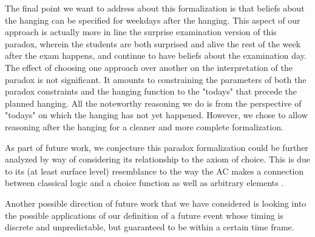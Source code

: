 \documentclass[runningheads]{llncs}
\newenvironment{myindent}{\begin{adjustwidth}{1cm}{}}{\end{adjustwidth}}
\begin{document}
The final point we want to address about this formalization is that beliefs about
the hanging can be specified for weekdays after the hanging.
This aspect of our approach is actually more in line the surprise examination version of this paradox,
wherein the students are both surprised and alive the rest of the week after the exam happens,
and continue to have beliefs about the examination day. The effect of choosing
one approach over another on the interpretation of the paradox is not significant.
It amounts to constraining the parameters of both the paradox constraints and
the hanging function to the "todays" that precede the planned hanging. All the noteworthy
reasoning we do is from the perspective of
 "todays" on which the hanging has not yet happened.
However, we chose to allow reasoning after the hanging for a cleaner and more
complete formalization.

As part of future work, we conjecture this paradox formalization could be further analyzed by way of considering its
relationship to the axiom of choice. This is due to its (at least surface level)
resemblance to the way the AC makes a connection between classical logic
and a choice function \cite{accomp} as well as arbitrary elements \cite{randomness}.

Another possible direction of future work that we have considered is looking into the
possible applications of our definition of a future event whose timing is discrete
and unpredictable,
but guaranteed to be within a certain time frame.

%
\end{document}
